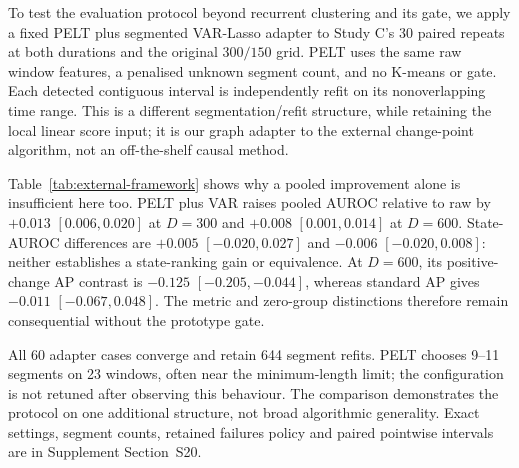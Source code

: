 To test the evaluation protocol beyond recurrent clustering and its gate, we
apply a fixed PELT plus segmented VAR-Lasso adapter to Study C's 30 paired
repeats at both durations and the original $300/150$ grid. PELT uses the same
raw window features, a penalised unknown segment count, and no K-means or
gate. Each detected contiguous interval is independently refit on its
nonoverlapping time range. This is a different segmentation/refit structure,
while retaining the local linear score input; it is our graph adapter to the
external change-point algorithm, not an off-the-shelf causal method.

Table~\ref{tab:external-framework} shows why a pooled improvement alone is
insufficient here too. PELT plus VAR raises pooled AUROC relative to raw by
$+0.013$ $[0.006,0.020]$ at $D=300$ and $+0.008$ $[0.001,0.014]$ at
$D=600$. State-AUROC differences are $+0.005$ $[-0.020,0.027]$ and
$-0.006$ $[-0.020,0.008]$: neither establishes a state-ranking gain or
equivalence. At $D=600$, its positive-change AP contrast is $-0.125$
$[-0.205,-0.044]$, whereas standard AP gives $-0.011$ $[-0.067,0.048]$.
The metric and zero-group distinctions therefore remain consequential
without the prototype gate.

All 60 adapter cases converge and retain 644 segment refits. PELT chooses
9--11 segments on 23 windows, often near the minimum-length limit; the
configuration is not retuned after observing this behaviour. The comparison
demonstrates the protocol on one additional structure, not broad algorithmic
generality. Exact settings, segment counts, retained failures policy and
paired pointwise intervals are in Supplement Section~S20.
